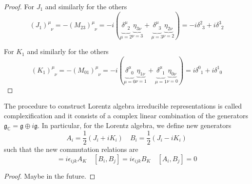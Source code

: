     \begin{proof}
        For $J_1$ and similarly for the others
        \begin{equation*}
            (J_1)^\mu_{\phantom \mu \nu} = - (M_{23})^\mu_{\phantom \mu \nu} = - i (\underbrace{\delta^\mu_{\phantom \mu 2}}_{\mu = 2} \underbrace{\eta_{3 \nu}}_{\nu = 3} + \underbrace{\delta^\mu_{\phantom \mu 3}}_{\mu = 3} \underbrace{\eta_{2 \nu}}_{\nu = 2}) = - i \delta^2_{\phantom 2 3} + i \delta^3_{\phantom 3 2}
        \end{equation*}

        For $K_1$ and similarly for the others 
        \begin{equation*}
            (K_1)^\mu_{\phantom \mu \nu} = - (M_{01})^\mu_{\phantom \mu \nu} = - i (\underbrace{\delta^\mu_{\phantom \mu 0}}_{\mu = 0} \underbrace{\eta_{1 \nu}}_{\nu = 1} + \underbrace{\delta^\mu_{\phantom \mu 1}}_{\mu = 1} \underbrace{\eta_{0 \nu}}_{\nu = 0}) = i \delta^0_{\phantom 0 1 } + i \delta^1_{\phantom 1 0}
        \end{equation*}
    \end{proof}

    The procedure to construct Lorentz algebra irreducible representations is called complexification and it consists of a complex linear combination of the generators $\mathfrak g_{\mathbb C} = \mathfrak g \oplus i \mathfrak g$. In particular, for the Lorentz algebra, we define new generators
    \begin{equation*}
        A_i = \frac{1}{2} (J_i + i K_i) \quad B_i = \frac{1}{2} (J_i - i K_i)
    \end{equation*}
    such that the new commutation relations are 
    \begin{equation*}
        [A_i, A_j] = i \epsilon_{ijk} A_K \quad [B_i, B_j] = i \epsilon_{ijk} B_K \quad [A_i, B_j] = 0
    \end{equation*}

    \begin{proof}
        Maybe in the future.
    \end{proof}


